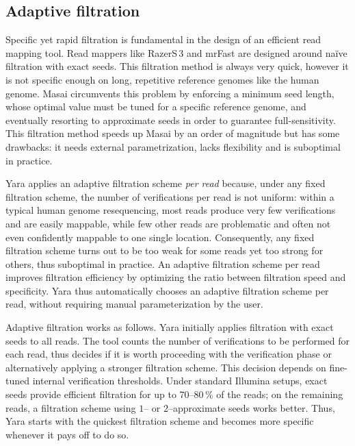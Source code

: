 \subsection{Adaptive filtration}
\label{sec:yara:eng:adaptive}

Specific yet rapid filtration is fundamental in the design of an efficient read mapping tool.
Read mappers like RazerS\,3 \citep{Weese2012} and mrFast \citep{Ahmadi2012} are designed around na\"ive filtration with exact seeds.
This filtration method is always very quick, however it is not specific enough on long, repetitive reference genomes like the human genome.
Masai \citep{Siragusa2013} circumvents this problem by enforcing a minimum seed length,
whose optimal value must be tuned for a specific reference genome, and eventually resorting to approximate seeds in order to guarantee full-sensitivity.
This filtration method speeds up Masai by an order of magnitude but has some drawbacks:
it needs external parametrization, lacks flexibility and is suboptimal in practice.

Yara applies an adaptive filtration scheme \emph{per read} because, under any fixed filtration scheme, the number of verifications per read is not uniform: within a typical human genome resequencing, most reads produce very few verifications and are easily mappable, while few other reads are problematic and often not even confidently mappable to one single location.
Consequently, any fixed filtration scheme turns out to be too weak for some reads yet too strong for others, thus suboptimal in practice.
An adaptive filtration scheme per read improves filtration efficiency by optimizing the ratio between filtration speed and specificity.
Yara thus automatically chooses an adaptive filtration scheme per read, without requiring manual parameterization by the user.

Adaptive filtration works as follows.
Yara initially applies filtration with exact seeds to all reads.
The tool counts the number of verifications to be performed for each read, thus decides if it is worth proceeding with the verification phase or alternatively applying a stronger filtration scheme.
This decision depends on fine-tuned internal verification thresholds.
Under standard Illumina setups, exact seeds provide efficient filtration for up to 70--80\,\% of the reads; on the remaining reads, a filtration scheme using $1$-- or $2$--approximate seeds works better.
Thus, Yara starts with the quickest filtration scheme and becomes more specific whenever it pays off to do so.

